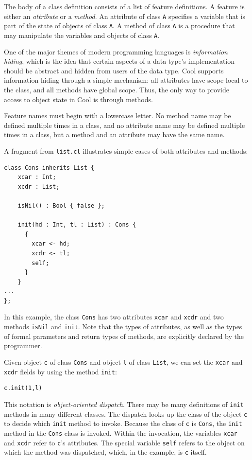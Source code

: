 \documentclass[]{article}
\begin{document}
The body of a class definition consists of a list of feature
definitions. A feature is either an \emph{attribute} or a \emph{method}.
An attribute of class \texttt{A} specifies a variable that is part of
the state of objects of class \texttt{A}. A method of class \texttt{A}
is a procedure that may manipulate the variables and objects of class
\texttt{A}.

One of the major themes of modern programming languages is
\emph{information hiding}, which is the idea that certain aspects of a
data type's implementation should be abstract and hidden from users of
the data type. Cool supports information hiding through a simple
mechanism: all attributes have scope local to the class, and all methods
have global scope. Thus, the only way to provide access to object state
in Cool is through methods.

Feature names must begin with a lowercase letter. No method name may be
defined multiple times in a class, and no attribute name may be defined
multiple times in a class, but a method and an attribute may have the
same name.

A fragment from \texttt{list.cl} illustrates simple cases of both
attributes and methods:

\begin{verbatim}
class Cons inherits List {
    xcar : Int;
    xcdr : List;

    isNil() : Bool { false };

    init(hd : Int, tl : List) : Cons {
      {
        xcar <- hd;
        xcdr <- tl;
        self;
      }
    }
...
};
\end{verbatim}

In this example, the class \texttt{Cons} has two attributes
\texttt{xcar} and \texttt{xcdr} and two methods \texttt{isNil} and
\texttt{init}. Note that the types of attributes, as well as the types
of formal parameters and return types of methods, are explicitly
declared by the programmer.

Given object \texttt{c} of class \texttt{Cons} and object \texttt{l} of
class \texttt{List}, we can set the \texttt{xcar} and \texttt{xcdr}
fields by using the method \texttt{init}:

\begin{verbatim}
c.init(1,l)
\end{verbatim}

This notation is \emph{object-oriented dispatch}. There may be many
definitions of \texttt{init} methods in many different classes. The
dispatch looks up the class of the object \texttt{c} to decide which
\texttt{init} method to invoke. Because the class of \texttt{c} is
\texttt{Cons}, the \texttt{init} method in the \texttt{Cons} class is
invoked. Within the invocation, the variables \texttt{xcar} and
\texttt{xcdr} refer to \texttt{c}'s attributes. The special variable
\texttt{self} refers to the object on which the method was dispatched,
which, in the example, is \texttt{c} itself.
\end{document}

